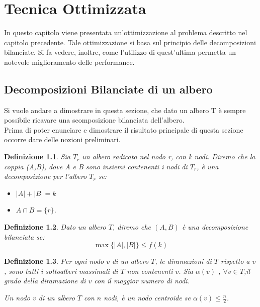 \chapter{Tecnica Ottimizzata}

In questo capitolo viene presentata un'ottimizzazione al problema descritto nel capitolo precedente.
Tale ottimizzazione si basa sul principio delle decomposizioni bilanciate.
Si fa vedere, inoltre, come l'utilizzo di quest'ultima permetta un notevole miglioramento delle performance.

\section{Decomposizioni Bilanciate di un albero}
\label{section3}
Si vuole andare a dimostrare in questa sezione, che dato un albero T \`e sempre possibile ricavare una scomposizione bilanciata dell'albero.
\\
Prima di poter enunciare e dimostrare il risultato principale di questa sezione occorre dare delle nozioni preliminari.

\newtheorem{definizione}{Definizione}[section]

\begin{definizione}
	\label{definizioneDeco}
Sia $T_r$ un albero radicato nel nodo r, con k nodi.
Diremo che la coppia (A,B), dove  A e B sono insiemi contenenti i nodi di $T_r$, \`e una decomposizione per l'albero $ T_r $ se:
\begin{itemize}
	\item $| A | + | B | = k$
	\item $A \cap B = \{r\}$.
\end{itemize}
\end{definizione}


\begin{definizione}
\label{lemmaDeco}
Dato un albero $ T $, diremo che $ (A,B) $ \`e una decomposizione bilanciata se:
\begin{equation*}
	\max{ \{|A| , |B| \} }  \le  f(k)
\end{equation*}
\end{definizione}





\begin{definizione}
Per ogni nodo $ v $ di un albero $ T $, le diramazioni di $ T $  rispetto a $ v $, sono tutti i sottoalberi massimali di $ T $ non contenenti $ v $. 
Sia  $\alpha(v)$  , $ \forall v \in T $,il grado della diramazione di $ v $ con il maggior numero di nodi.

Un nodo $ v $ di un albero $ T $ con $ n $ nodi, \`e un nodo centroide se $\alpha(v)\le\frac{n}{2}$.
\end{definizione}\mbox{}

